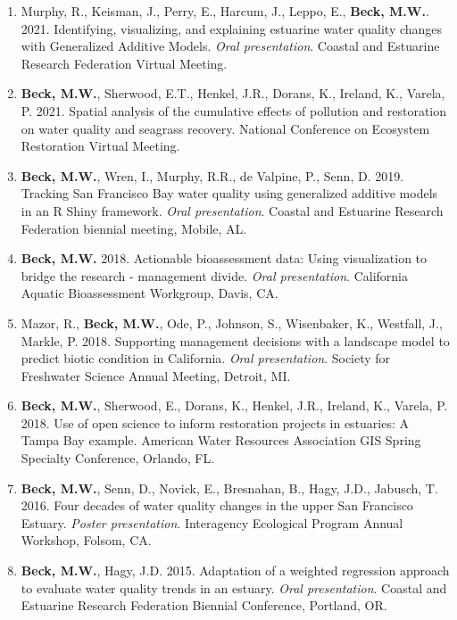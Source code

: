 \documentclass[letterpaper,12pt]{article}
\begin{document}
\begin{enumerate}
\item Murphy, R., Keisman, J., Perry, E., Harcum, J., Leppo, E., {\bf Beck, M.W.}. 2021. Identifying, visualizing, and explaining estuarine water quality changes with Generalized Additive Models. \textit{Oral presentation}. Coastal and Estuarine Research Federation Virtual Meeting.

\item {\bf Beck, M.W.},  Sherwood, E.T., Henkel, J.R., Dorans, K., Ireland, K., Varela, P. 2021. Spatial analysis of the cumulative effects of pollution and restoration on water quality and seagrass recovery.  National Conference on Ecosystem Restoration Virtual Meeting.

\item {\bf Beck, M.W.}, Wren, I., Murphy, R.R., de Valpine, P., Senn, D. 2019. Tracking San Francisco Bay water quality using generalized additive models in an R Shiny framework. \textit{Oral presentation}. Coastal and Estuarine Research Federation biennial meeting, Mobile, AL.

\item {\bf Beck, M.W.} 2018. Actionable bioassessment data: Using visualization to bridge the research - management divide. \textit{Oral presentation}. California Aquatic Bioassessment Workgroup, Davis, CA.

\item Mazor, R., {\bf Beck, M.W.}, Ode, P., Johnson, S., Wisenbaker, K., Westfall, J., Markle, P. 2018. Supporting management decisions with a landscape model to predict biotic condition in California. \textit{Oral presentation}. Society for Freshwater Science Annual Meeting, Detroit, MI.

\item {\bf Beck, M.W.}, Sherwood, E., Dorans, K., Henkel, J.R., Ireland, K., Varela, P. 2018. Use of open science to inform restoration projects in estuaries: A Tampa Bay example. American Water Resources Association GIS Spring Specialty Conference, Orlando, FL. 

\item {\bf Beck, M.W.}, Senn, D., Novick, E., Bresnahan, B., Hagy, J.D., Jabusch, T. 2016. Four decades of water quality changes in the upper San Francisco Estuary. \textit{Poster presentation}. Interagency Ecological Program Annual Workshop, Folsom, CA.

\item {\bf Beck, M.W.}, Hagy, J.D. 2015. Adaptation of a weighted regression approach to evaluate water quality trends in an estuary. \textit{Oral presentation}. Coastal and Estuarine Research Federation Biennial Conference, Portland, OR.


\end{enumerate}
\end{document}
